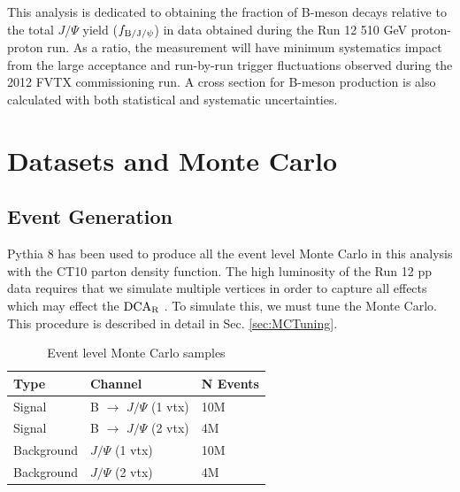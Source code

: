 \documentclass[12pt]{article}
\newcommand{\jpsi}{$J/\Psi$ }
\newcommand{\dcar}{$\rm{DCA}_{R}$ }
\begin{document}
This analysis is dedicated to obtaining the fraction of B-meson decays relative to the total \jpsi yield ($f_{\rm B/J/\psi}$) in data obtained during the Run 12 510 GeV proton-proton run.
 As a ratio, the measurement will have minimum systematics impact from the large acceptance and run-by-run trigger fluctuations observed during the 2012 FVTX commissioning run.  
 A cross section for B-meson production is also calculated with both statistical and systematic uncertainties. 


\section{Datasets and Monte Carlo}
\label{sec:Datasets}

\subsection{Event Generation}
\label{sec:EventGen}

Pythia 8 has been used to produce all the event level Monte Carlo in this analysis with the CT10 \cite{ref:CT10} parton density function.  
The high luminosity of the Run 12 pp data requires that we simulate multiple vertices in order to capture all effects which may effect
the \dcar.  To simulate this, we must tune the Monte Carlo.  This procedure is described in detail in Sec. \ref{sec:MCTuning}.


\begin{table}[h]
\centering
\caption{Event level Monte Carlo samples}
\begin{tabular}{| l | l | l |}\hline

Type        &    Channel       &    N Events \\ \hline \hline
Signal      &   B $\to$ \jpsi (1 vtx)        &    10M        \\  
Signal      &   B $\to$ \jpsi (2 vtx)        &    4M        \\  
Background   &   \jpsi (1 vtx)       &    10M        \\  
Background   &   \jpsi (2 vtx)       &    4M        \\  \hline

\end{tabular}
\label{tab:EventGen}
\end{table}

\end{document}
